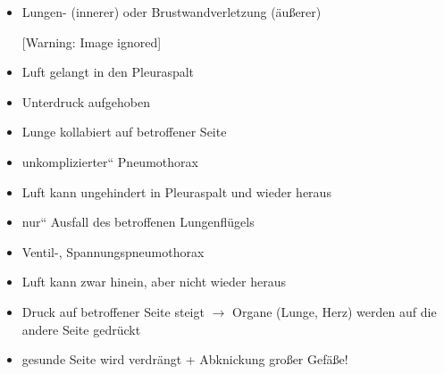 \documentclass{article}
\begin{document}
\begin{itemize}
\item {\mdseries
Lungen- (innerer) oder  Brustwandverletzung (\"au{\ss}erer)}

\begin{center}
 [Warning: Image ignored] %

\end{center}
\end{itemize}
\begin{itemize}
\item {\mdseries
Luft gelangt in den Pleuraspalt}

\item {\mdseries
Unterdruck aufgehoben}

\item {\mdseries
Lunge kollabiert auf betroffener Seite}

\end{itemize}
\begin{itemize}
\item {\mdseries
{\quotedblbase}unkomplizierter{\textquotedblleft} Pneumothorax}

\end{itemize}
\begin{itemize}
\item {\mdseries
Luft kann ungehindert in Pleuraspalt und  wieder heraus}

\item {\mdseries
{\quotedblbase}nur{\textquotedblleft} Ausfall des betroffenen
Lungenfl\"ugels}

\end{itemize}
\begin{itemize}
\item {\mdseries
Ventil-, Spannungspneumothorax}

\end{itemize}
\begin{itemize}
\item {\mdseries
Luft kann zwar hinein, aber nicht wieder  heraus}

\item {\mdseries
Druck auf betroffener Seite steigt ${\rightarrow}$  Organe (Lunge, Herz)
werden auf die andere Seite gedr\"uckt}

\end{itemize}
\begin{itemize}
\item {\mdseries
gesunde Seite wird verdr\"angt + Abknickung  gro{\ss}er Gef\"a{\ss}e!}

\end{itemize}
\end{document}
